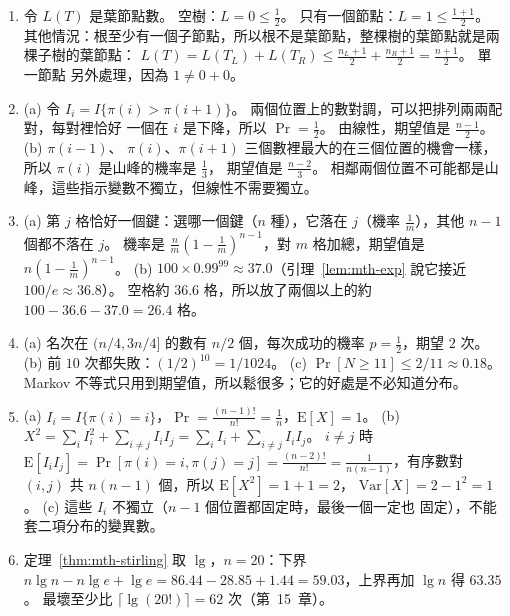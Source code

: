 \begin{enumerate}
\item 令 $L(T)$ 是葉節點數。 空樹：$L = 0 \le \frac12$。 只有一個節點：$L = 1 \le \frac{1+1}{2}$。
其他情況：根至少有一個子節點，所以根不是葉節點，整棵樹的葉節點就是兩棵子樹的葉節點：
$L(T) = L(T_L) + L(T_R) \le \frac{n_L + 1}{2} + \frac{n_R + 1}{2} = \frac{n + 1}{2}$。 單一節點
另外處理，因為 $1 \ne 0 + 0$。

\item (a) 令 $I_i = I\{\pi(i) > \pi(i+1)\}$。 兩個位置上的數對調，可以把排列兩兩配對，每對裡恰好
一個在 $i$ 是下降，所以 $\Pr = \frac12$。 由線性，期望值是 $\frac{n-1}{2}$。 (b) $\pi(i-1)$、
$\pi(i)$、$\pi(i+1)$ 三個數裡最大的在三個位置的機會一樣，所以 $\pi(i)$ 是山峰的機率是 $\frac13$，
期望值是 $\frac{n-2}{3}$。 相鄰兩個位置不可能都是山峰，這些指示變數不獨立，但線性不需要獨立。

\item (a) 第 $j$ 格恰好一個鍵：選哪一個鍵（$n$ 種），它落在 $j$（機率 $\frac1m$），其他
$n - 1$ 個都不落在 $j$。 機率是 $\frac{n}{m}(1 - \frac1m)^{n-1}$，對 $m$ 格加總，期望值是
$n(1 - \frac1m)^{n-1}$。 (b) $100 \times 0.99^{99} \approx 37.0$（引理~\ref{lem:mth-exp} 說它接近
$100/e \approx 36.8$）。 空格約 $36.6$ 格，所以放了兩個以上的約 $100 - 36.6 - 37.0 = 26.4$ 格。

\item (a) 名次在 $(n/4, 3n/4]$ 的數有 $n/2$ 個，每次成功的機率 $p = \frac12$，期望 $2$ 次。
(b) 前 $10$ 次都失敗：$(1/2)^{10} = 1/1024$。 (c) $\Pr[N \ge 11] \le 2/11 \approx
0.18$。 Markov 不等式只用到期望值，所以鬆很多；它的好處是不必知道分布。

\item (a) $I_i = I\{\pi(i) = i\}$，$\Pr = \frac{(n-1)!}{n!} = \frac1n$，$\mathrm{E}[X] = 1$。
(b) $X^2 = \sum_i I_i^2 + \sum_{i \ne j} I_i I_j = \sum_i I_i + \sum_{i \ne j} I_i I_j$。
$i \ne j$ 時 $\mathrm{E}[I_i I_j] = \Pr[\pi(i) = i, \pi(j) = j] = \frac{(n-2)!}{n!} =
\frac{1}{n(n-1)}$，有序數對 $(i, j)$ 共 $n(n-1)$ 個，所以 $\mathrm{E}[X^2] = 1 + 1 = 2$，
$\mathrm{Var}[X] = 2 - 1^2 = 1$。 (c) 這些 $I_i$ 不獨立（$n - 1$ 個位置都固定時，最後一個一定也
固定），不能套二項分布的變異數。

\item 定理~\ref{thm:mth-stirling} 取 $\lg$，$n = 20$：下界 $n \lg n - n \lg e + \lg e = 86.44 - 28.85 +
1.44 = 59.03$，上界再加 $\lg n$ 得 $63.35$。 最壞至少比 $\lceil \lg(20!) \rceil = 62$ 次（第~15~章）。
\end{enumerate}
